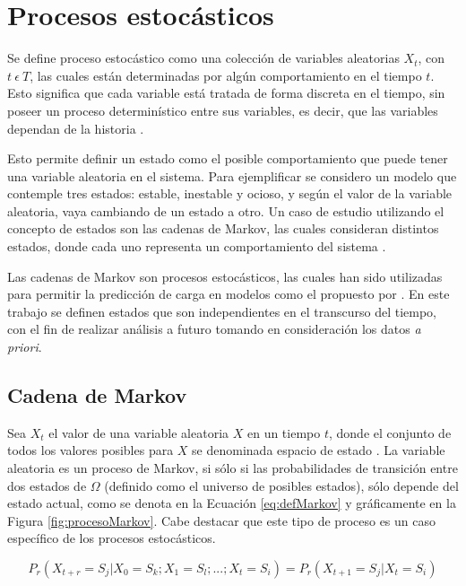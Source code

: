 \section{Procesos estocásticos}
\label{sec:procesosEstocasticos}

Se define proceso estocástico como una colección de variables aleatorias {$X_t$, con $t ~ \epsilon ~ T$}, las cuales están determinadas por algún comportamiento en el tiempo $t$. Esto significa que cada variable está tratada de forma discreta en el tiempo, sin poseer un proceso determinístico entre sus variables, es decir, que las variables dependan de la historia \citep{taylor2014introduction}.

Esto permite definir un estado como el posible comportamiento que puede tener una variable aleatoria en el sistema. Para ejemplificar se considero un modelo que contemple tres estados: estable, inestable y ocioso, y según el valor de la variable aleatoria, vaya cambiando de un estado a otro. Un caso de estudio utilizando el concepto de estados son las cadenas de Markov, las cuales consideran distintos estados, donde cada uno representa un comportamiento del sistema \citep{de1978calculus}.

Las cadenas de Markov son procesos estocásticos, las cuales han sido utilizadas para permitir la predicción de carga en modelos como el propuesto por \citep{GongGW10}. En este trabajo se definen estados que son independientes en el transcurso del tiempo, con el fin de realizar análisis a futuro tomando en consideración los datos \textit{a priori}.

\subsection{Cadena de Markov}
\label{subsec:cadenaMarkov}

Sea $X_t$ el valor de una variable aleatoria $X$ en un tiempo $t$, donde el conjunto de todos los valores posibles para $X$ se denominada espacio de estado \citep{ching2006markov}. La variable aleatoria es un proceso de Markov, si sólo si las probabilidades de transición entre dos estados de $\Omega$ (definido como el universo de posibles estados), sólo depende del estado actual, como se denota en la Ecuación \ref{eq:defMarkov} y gráficamente en la Figura \ref{fig:procesoMarkov}. Cabe destacar que este tipo de proceso es un caso específico de los procesos estocásticos.

\begin{equation} \label{eq:defMarkov} 
	P_r(X_{t+r} = S_j | X_0 = S_k ; X_1 = S_l ; ... ; X_t = S_i) = P_r(X_{t+1} = S_j | X_t = S_i)
\end{equation}

